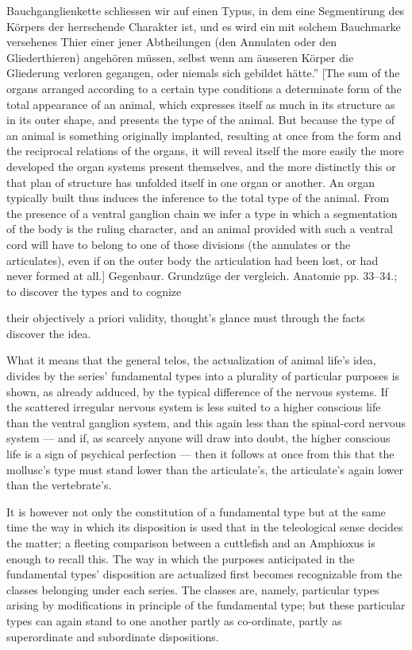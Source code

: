 \documentclass[12pt,a4paper]{book}
\begin{document}
{Bauchganglienkette schliessen wir auf einen Typus, in dem eine Segmentirung des
Körpers der herrschende Charakter ist, und es wird ein mit solchem Bauchmarke
versehenes Thier einer jener Abtheilungen (den Annulaten oder den Gliederthieren)
angehören müssen, selbst wenn am äusseren Körper die Gliederung verloren gegangen,
oder niemals sich gebildet hätte.'' [The sum of the organs arranged according to a
certain type conditions a determinate form of the total appearance of an animal, which
expresses itself as much in its structure as in its outer shape, and presents the type
of the animal. But because the type of an animal is something originally implanted,
resulting at once from the form and the reciprocal relations of the organs, it will
reveal itself the more easily the more developed the organ systems present themselves,
and the more distinctly this or that plan of structure has unfolded itself in one
organ or another. An organ typically built thus induces the inference to the total type
of the animal. From the presence of a ventral ganglion chain we infer a type in which a
segmentation of the body is the ruling character, and an animal provided with such a
ventral cord will have to belong to one of those divisions (the annulates or the
articulates), even if on the outer body the articulation had been lost, or had never
formed at all.] Gegenbaur. Grundzüge der vergleich. Anatomie pp. 33--34.};
to discover the types and to cognize

\setcounter{footnote}{0}
their objectively a priori validity, thought's glance must through the facts discover
the idea.

What it means that the general telos, the actualization of animal life's idea, divides
by the series' fundamental types into a plurality of particular purposes is shown, as
already adduced, by the typical difference of the nervous systems. If the scattered
irregular nervous system is less suited to a higher conscious life than the ventral
ganglion system, and this again less than the spinal-cord nervous system --- and if,
as scarcely anyone will draw into doubt, the higher conscious life is a sign of
psychical perfection --- then it follows at once from this that the mollusc's type must
stand lower than the articulate's, the articulate's again lower than the vertebrate's.

It is however not only the constitution of a fundamental type but at the same time the
way in which its disposition is used that in the teleological sense decides the matter;
a fleeting comparison between a cuttlefish and an Amphioxus is enough to recall this.
The way in which the purposes anticipated in the fundamental types' disposition are
actualized first becomes recognizable from the classes belonging under each series. The
classes are, namely, particular types arising by modifications in principle of the
fundamental type; but these particular types can again stand to one another partly as
co-ordinate, partly as superordinate and subordinate dispositions.
\end{document}
